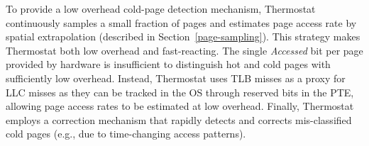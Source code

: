 To provide a low overhead cold-page detection mechanism, Thermostat continuously samples a
small fraction of pages and estimates page access rate by spatial extrapolation
(described in Section~\ref{page-sampling}).
This strategy makes Thermostat both low overhead and fast-reacting. The single
\emph{Accessed} bit per page provided by hardware is insufficient to distinguish hot
and cold pages with sufficiently low overhead.  Instead, Thermostat uses TLB misses as a proxy for LLC misses 
as they can be tracked in the OS through reserved bits in the PTE, allowing page access rates to be estimated at low overhead.
Finally, Thermostat employs a correction mechanism that rapidly detects
and corrects mis-classified cold pages (e.g., due to time-changing access patterns).

